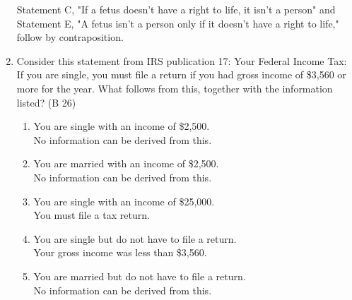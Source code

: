 \documentclass{article}
\begin{document}
\begin{enumerate}
          Statement C, "If a fetus doesn't have a right to life, it isn't a person" and Statement E, "A fetus isn’t a person only if it doesn’t have a right to life," follow by contraposition.
    \item Consider this statement from IRS publication 17: Your Federal Income Tax: If you are single, you must file a return if you had gross income of \$3,560 or more for the year. What follows from this, together with the information listed? (B 26)
          \begin{enumerate}
              \item You are single with an income of \$2,500.\\
                    No information can be derived from this.
              \item You are married with an income of \$2,500.\\
                    No information can be derived from this.
              \item You are single with an income of \$25,000.\\
                    You must file a tax return.
              \item You are single but do not have to file a return.\\
                    Your gross income was less than \$3,560.
              \item You are married but do not have to file a return.\\
                    No information can be derived from this.
          \end{enumerate}
\end{enumerate}
\end{document}
